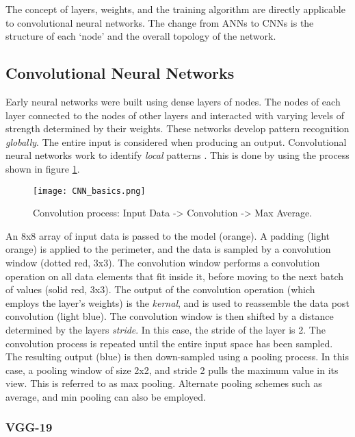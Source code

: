 		The concept of layers, weights, and the training algorithm are directly applicable to convolutional neural networks. The change from ANNs to CNNs is the structure of each `node' and the overall topology of the network.


	\subsection{Convolutional Neural Networks}

		Early neural networks were built using dense layers of nodes. The nodes of each layer connected to the nodes of other layers and interacted with varying levels of strength determined by their weights. These networks develop pattern recognition \textit{globally}. The entire input is considered when producing an output. Convolutional neural networks work to identify \textit{local} patterns \cite{Chollet}. This is done by using the process shown in figure \ref{fig:convo}.

		\begin{figure}[htbp]
			\centering
			 \texttt{[image: CNN\_basics.png]}
			\caption[CNN overview]{Convolution process:  Input Data -> Convolution -> Max Average.}
			\label{fig:convo}
		\end{figure}

		An 8x8 array of input data is passed to the model (orange). A padding (light orange) is applied to the perimeter, and the data is sampled by a convolution window (dotted red, 3x3). The convolution window performs a convolution operation on all data elements that fit inside it, before moving to the next batch of values (solid red, 3x3). The output of the convolution operation (which employs the layer's weights) is the \textit{kernal}, and is used to reassemble the data post convolution (light blue). The convolution window is then shifted by a distance determined by the layers \textit{stride}. In this case, the stride of the layer is 2. The convolution process is repeated until the entire input space has been sampled. The resulting output (blue) is then down-sampled using a pooling process. In this case, a pooling window of size 2x2, and stride 2 pulls the maximum value in its view. This is referred to as max pooling. Alternate pooling schemes such as average, and min pooling can also be employed.

		\subsubsection{VGG-19}

